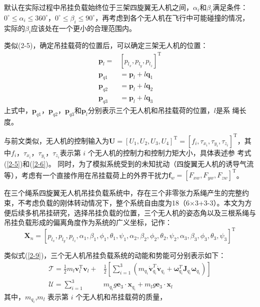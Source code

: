 \documentclass[lang=chs, degree=master, blindreview=false, winfonts=true]{yanputhesis}
\begin{document}
默认在实际过程中吊挂负载始终位于三架四旋翼无人机之间，$\alpha_{i}$和$\beta_i$满足条件：
$0^\circ\leq\alpha_i\leq360^\circ$，$0^\circ\leq\beta_i\leq90^\circ$，再考虑到各个无人机在飞行中可能碰撞的情况，实际的$\beta_i$应该处在一个更小的合理范围内。

类似(2-5)，确定吊挂载荷的位置后，可以确定三架无人机的位置：
\begin{equation}
\begin{aligned}
	\boldsymbol{p}_{l}=&\left[p_{l_{x}},p_{l_{y}},p_{l_{z}}\right]^{\mathrm{T}} \\
	\boldsymbol{p}_{q1}&=\boldsymbol{p}_l+l\boldsymbol{q}_1 \\
	\boldsymbol{p}_{q2}&=\boldsymbol{p}_{l}+l\boldsymbol{q}_{2} \\
	\boldsymbol{p}_{q3}&=\boldsymbol{p}_l+l\boldsymbol{q}_3
\end{aligned}
\end{equation}
上式中，$\bm{p}_{q1}$，$\bm{p}_{q2}$，$\bm{p}_{q3}$和$\bm{p}_l$分别表示三个无人机和吊挂载荷的位置，$l$是系
绳长度。

与前文类似，无人机的控制输入为$\bm{U}=\left[U_1,U_2,U_3,U_4\right]^\mathrm{T}=\left[f_i,\tau_{x_i},\tau_{y_i},\tau_{z_i}\right]^\mathrm{T}$，其中$f_{i}$，$\tau_{x_i}$，$\tau_{y_i}$，$\tau_{z_i}$表示第 $i$ 个无人机的控制力和控制力矩大小，具体表述参
考式(\ref{2-5})和(\ref{2-6})。
同时，为了模拟系统受到的未知扰动（四旋翼无人机的诱导气流等），考虑有一个直接作用在吊挂载荷上的外界干扰力${\boldsymbol{f}}_{w}=\left[F_{xw},F_{yw},F_{zw}\right]^\mathrm{T}$。

在三个绳系四旋翼无人机吊挂负载系统中，存在三个非零张力系绳产生的完整约束，不考虑负载的刚体转动情况下，整个系统自由度为18（6×3+3-3）。本文为方便后续多机吊挂研究，选择吊挂负载的位置，三个无人机的姿态角以及三根系绳与吊挂负载形成的偏离角度作为系统的广义坐标，记作：
$$\boldsymbol{X}_n=
\left[
	p_{l_x} , p_{l_y} , p_{l_z},\alpha_1,\beta_1,\phi_1,\theta_1,\psi_1,\alpha_2,\beta_2,\phi_2,\theta_2,\psi_2,\alpha_3,\beta_3,\phi_3,\theta_3,\psi_3
\right]^\mathrm T$$

类似式(\ref{2-9})，三个无人机吊挂负载系统的动能和势能可分别表示如下：
\begin{equation}
	\begin{aligned}
	\mathcal{T}=\frac{1}{2}m_{l}{\boldsymbol{v}}_{l}^\mathrm{T}{\boldsymbol{v}}_{l}+&\frac{1}{2}\left[\sum_{i=1}^{3}\left(m_{q_{i}}\dot{\boldsymbol{v}}_{q_{i}}^{T}\dot{\boldsymbol{v}}_{q_{i}}+\boldsymbol{\omega}_{q_{i}}^{T}\boldsymbol{J}_{q_{i}}\boldsymbol{\omega}_{q_{i}}\right)\right] \\
	\mathcal{U}=\sum_{i=1}^{3}&m_{q_{i}}g\boldsymbol{e}_3\cdot\boldsymbol{x}_{q_{i}}+m_{l}g\boldsymbol{e}_3\cdot\boldsymbol{x}_{l}
\end{aligned}
\label{2-18}
\end{equation}
其中，$m_{q_{i}}$,$m_l$ 表示第 $i$ 个无人机和吊挂载荷的质量，
\end{document}
